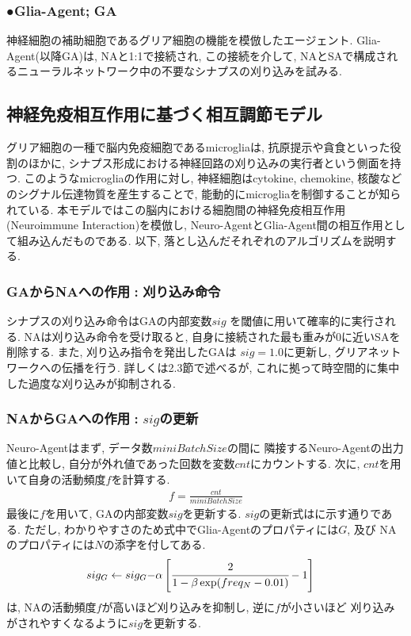 \documentclass[a4paper, 10.5pt,twocolumn,dvipdfmx]{jsarticle}
\begin{document}
  \subsubsection*{●Glia-Agent;\,\,GA}
  神経細胞の補助細胞であるグリア細胞の機能を模倣したエージェント. 
  Glia-Agent(以降GA)は, NAと1:1で接続され, この接続を介して, 
  NAとSAで構成されるニューラルネットワーク中の不要なシナプスの刈り込みを試みる.
  \vspace{2mm}
\subsection{神経免疫相互作用に基づく相互調節モデル}
グリア細胞の一種で脳内免疫細胞であるmicrogliaは, 抗原提示や貪食といった役割のほかに,  
シナプス形成における神経回路の刈り込みの実行者という側面を持つ. 
このようなmicrogliaの作用に対し, 
神経細胞はcytokine, chemokine, 核酸などのシグナル伝達物質を産生することで, 
能動的にmicrogliaを制御することが知られている. 
本モデルではこの脳内における細胞間の神経免疫相互作用(Neuroimmune Interaction)を模倣し, 
Neuro-AgentとGlia-Agent間の相互作用として組み込んだものである. 
以下, 落とし込んだそれぞれのアルゴリズムを説明する.
\vspace{2mm}
\subsubsection{GAからNAへの作用\,\,:\,\,刈り込み命令}
シナプスの刈り込み命令はGAの内部変数$sig$
を閾値に用いて確率的に実行される.
NAは刈り込み命令を受け取ると, 自身に接続された最も重みが0に近いSAを
削除する.
また, 刈り込み指令を発出したGAは
$sig=1.0$に更新し, グリアネットワークへの伝播を行う.
詳しくは2.3節で述べるが, これに拠って時空間的に集中した過度な刈り込みが抑制される.

\vspace{2mm}
\subsubsection{NAからGAへの作用\,\,:\,\,$sig$の更新}
Neuro-Agentはまず, データ数$miniBatchSize$の間に
隣接するNeuro-Agentの出力値と比較し, 自分が外れ値であった回数を変数$cnt$にカウントする.
次に, $cnt$を用いて自身の活動頻度$f$を計算する.
\begin{align}
  f=\displaystyle\frac{cnt}{miniBatchSize}
\end{align}
最後に$f$を用いて, GAの内部変数$sig$を更新する.
$sig$の更新式はに示す通りである. 
ただし, わかりやすさのため式中でGlia-Agentのプロパティには$G$, 及び
NAのプロパティには$N$の添字を付してある.
\begin{align}
  sig_G\leftarrow sig_G-&\alpha\left[\cfrac{2}{1-\beta\exp(freq_N-0.01)}-1\right]
  \label{eq:sig}
\end{align}
は, NAの活動頻度$f$が高いほど刈り込みを抑制し, 逆に$f$が小さいほど
刈り込みがされやすくなるように$sig$を更新する.
\end{document}
